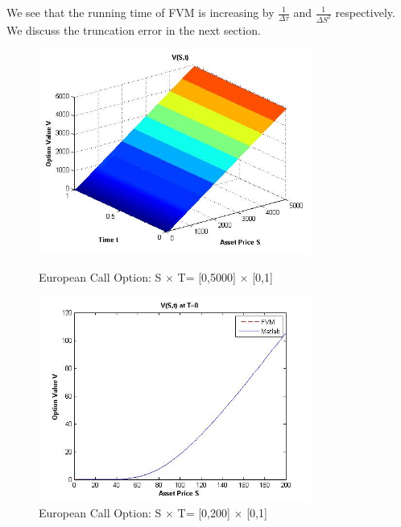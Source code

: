 \documentclass[final]{siamltex}
\begin{document}
We see that the running time of FVM is increasing by $\frac{1}{\Delta \tau}$ and $\frac{1}{\Delta S^2}$ respectively. We discuss the truncation error in the next section.

\begin{figure}[H]
	\centering
	 
		\includegraphics[width=0.8\textwidth]{European_call_all}
		\caption{European Call Option: S $\times $ T= [0,5000] $\times $ [0,1]}
	
		\includegraphics[width=0.8\textwidth]{European_call_Final_all}
		\caption{European Call Option: S $\times $ T= [0,200] $\times $ [0,1]}

		\label{European_call_all}	
\end{figure}
\end{document}
